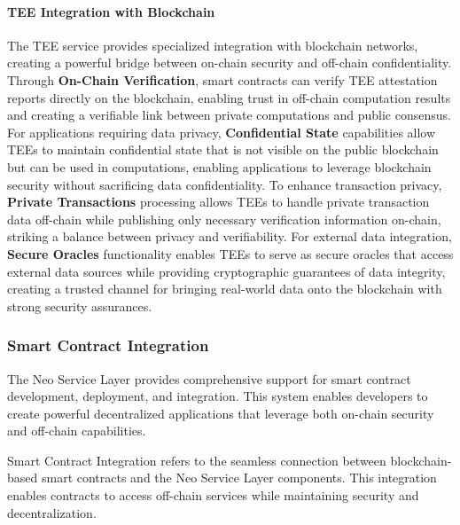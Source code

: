 \documentclass[12pt,a4paper]{article}
\begin{document}
\paragraph{TEE Integration with Blockchain}
The TEE service provides specialized integration with blockchain networks, creating a powerful bridge between on-chain security and off-chain confidentiality. Through \textbf{On-Chain Verification}, smart contracts can verify TEE attestation reports directly on the blockchain, enabling trust in off-chain computation results and creating a verifiable link between private computations and public consensus. For applications requiring data privacy, \textbf{Confidential State} capabilities allow TEEs to maintain confidential state that is not visible on the public blockchain but can be used in computations, enabling applications to leverage blockchain security without sacrificing data confidentiality. To enhance transaction privacy, \textbf{Private Transactions} processing allows TEEs to handle private transaction data off-chain while publishing only necessary verification information on-chain, striking a balance between privacy and verifiability. For external data integration, \textbf{Secure Oracles} functionality enables TEEs to serve as secure oracles that access external data sources while providing cryptographic guarantees of data integrity, creating a trusted channel for bringing real-world data onto the blockchain with strong security assurances.

\subsubsection{Smart Contract Integration}
\label{subsubsec:smart-contract}

The Neo Service Layer provides comprehensive support for smart contract development, deployment, and integration. This system enables developers to create powerful decentralized applications that leverage both on-chain security and off-chain capabilities.



\begin{definition}
Smart Contract Integration refers to the seamless connection between blockchain-based smart contracts and the Neo Service Layer components. This integration enables contracts to access off-chain services while maintaining security and decentralization.
\end{definition}
\end{document}
